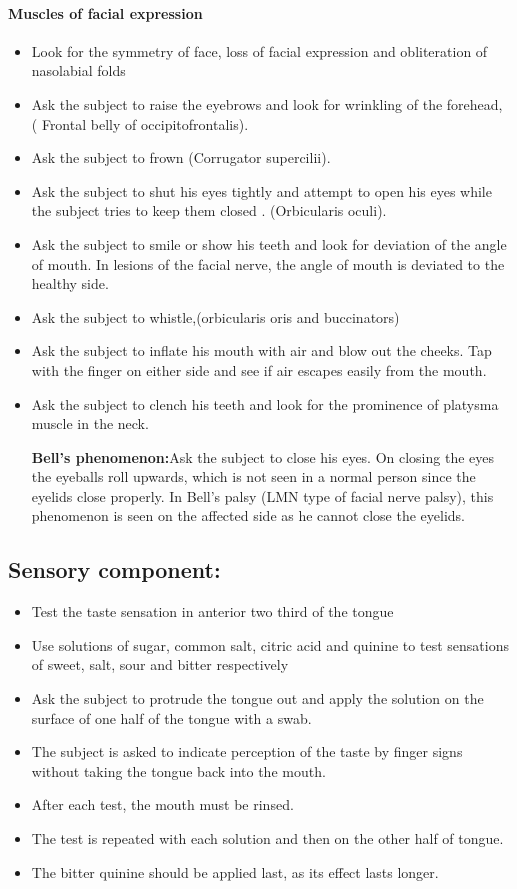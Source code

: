 \documentclass[a4paper,12pt,openany,oneside]{book}
\begin{document}
\paragraph{Muscles of facial expression}
\begin{itemize}
\item{Look for the symmetry of face, loss of facial expression and obliteration of nasolabial folds}
\item{Ask the subject to raise the eyebrows and look for wrinkling of the forehead, ( Frontal belly of occipitofrontalis).}
\item{Ask the subject to frown (Corrugator supercilii).}
\item{Ask the subject to shut his eyes tightly and attempt to open his eyes while the subject tries to keep them closed . (Orbicularis oculi).}
\item{Ask the subject to smile or show his teeth and look for deviation of the angle of mouth. In lesions of the facial nerve, the angle of mouth is deviated to the healthy side.}
\item{Ask the subject to whistle,(orbicularis oris and buccinators)}
\item{Ask the subject to inflate his mouth with air and blow out the cheeks. Tap with the finger on either side and see if air escapes easily from the mouth.}
\item{Ask the subject to clench his teeth and look for the prominence of platysma muscle in the neck.
	\par
		\textbf{Bell’s phenomenon:}Ask the subject to close his eyes. On closing the eyes the eyeballs roll upwards, which is not seen in a normal person since the eyelids close properly. In Bell’s palsy (LMN type of facial nerve palsy), this phenomenon is seen on the affected side as he cannot close the eyelids.}
\end{itemize}
\subsection*{Sensory component:}
\begin{itemize}
		\itemsep0em
\item{Test the taste sensation in anterior two third of the tongue}
\item{Use solutions of sugar, common salt, citric acid and quinine to test sensations of sweet, salt, sour and bitter respectively}
\item{Ask the subject to protrude the tongue out and apply the solution on the surface of one half of the tongue with a swab.}
\item{The subject is asked to indicate perception of the taste by finger signs without taking the tongue back into the mouth.}
\item{After each test, the mouth must be rinsed.}
\item{The test is repeated with each solution and then on the other half of tongue.}
\item{The bitter quinine should be applied last, as its effect lasts longer.}
\end{itemize}
\end{document}

